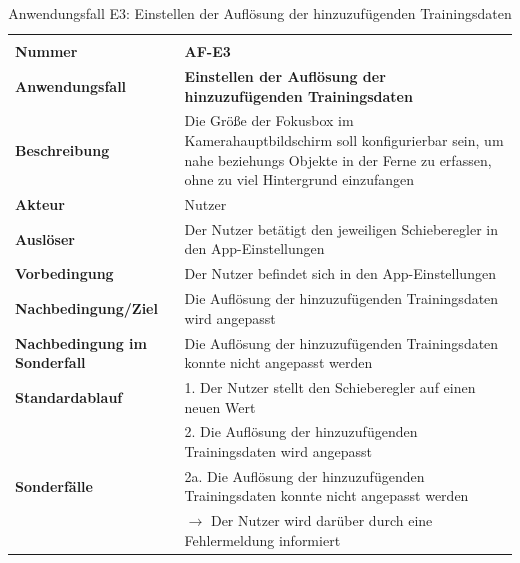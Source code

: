 \documentclass[oneside]{ausarbeitung}
\begin{document}
\begin{table}[htbp]
	\centering
	\begin{tabular}{|l|p{80mm}|}
		\hline\\
		\textbf{Nummer} & \textbf{AF-E3} \\ \hline
		\textbf{Anwendungsfall} & \textbf{Einstellen der Auflösung der hinzuzufügenden Trainingsdaten} \\ \hline
		\textbf{Beschreibung} & Die Größe der Fokusbox im Kamerahauptbildschirm soll konfigurierbar sein, um nahe beziehungs Objekte in der Ferne zu erfassen, ohne zu viel Hintergrund einzufangen \\ \hline
		\textbf{Akteur} & Nutzer \\ \hline
		\textbf{Auslöser} & Der Nutzer betätigt den jeweiligen Schieberegler in den App-Einstellungen \\ \hline
		\textbf{Vorbedingung} & Der Nutzer befindet sich in den App-Einstellungen \\ \hline	
		\textbf{Nachbedingung/Ziel} & Die Auflösung der hinzuzufügenden Trainingsdaten wird angepasst \\ \hline
		\textbf{Nachbedingung im Sonderfall} & Die Auflösung der hinzuzufügenden Trainingsdaten konnte nicht angepasst werden \\ \hline
		\textbf{Standardablauf} & 1. Der Nutzer stellt den Schieberegler auf einen neuen Wert \\
		& 2. Die Auflösung der hinzuzufügenden Trainingsdaten wird angepasst \\ \hline
		\textbf{Sonderfälle} & 2a. Die Auflösung der hinzuzufügenden Trainingsdaten konnte nicht angepasst werden \\ & $\rightarrow$ Der Nutzer wird darüber durch eine Fehlermeldung informiert \\ \hline
		
	\end{tabular}
	\caption{Anwendungsfall E3: Einstellen der Auflösung der hinzuzufügenden Trainingsdaten}
	\label{tab:use-case-set-resolution}
\end{table}
\end{document}
